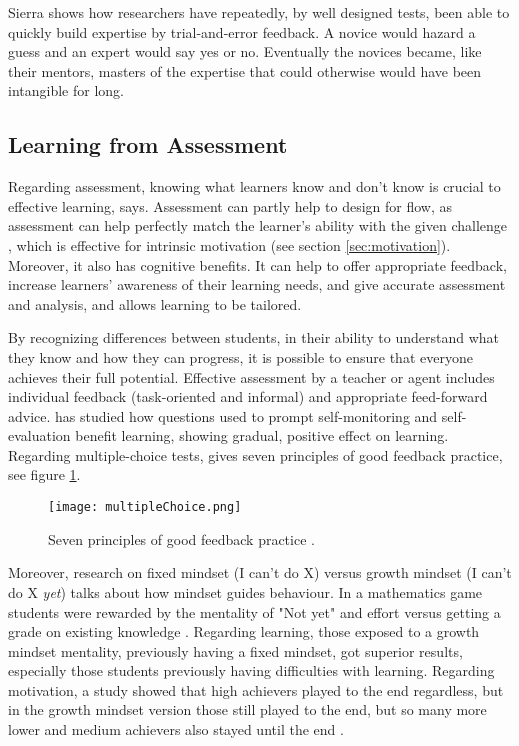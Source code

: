   Sierra shows how researchers have repeatedly, by well designed tests, been able to quickly build expertise by trial-and-error feedback. A novice would hazard a guess and an expert would say yes or no. Eventually the novices became, like their mentors, masters of the expertise that could otherwise would have been intangible for long.

  \subsection{Learning from Assessment}\label{learning-assessment}

  Regarding assessment, knowing what learners know and don't know is crucial to effective learning, \cite{luckin} says. Assessment can partly help to design for flow, as assessment can help perfectly match the learner's ability with the given challenge \citep{bruhlmann}, which is effective for intrinsic motivation (see section \ref{sec:motivation}). Moreover, it also has cognitive benefits. It can help to offer appropriate feedback, increase learners' awareness of their learning needs, and give accurate assessment and analysis, and allows learning to be tailored.

  By recognizing differences between students, in their ability to understand what they know and how they can progress, it is possible to ensure that everyone achieves their full potential. Effective assessment by a teacher or agent includes individual feedback (task-oriented and informal) and appropriate feed-forward advice. \cite{sitzmann} has studied how questions used to prompt self-monitoring and self-evaluation benefit learning, showing gradual, positive  effect on learning. Regarding multiple-choice tests, \cite{nicol} gives seven principles of good feedback practice, see figure \ref{fig:multiple-choice}.

  \begin{figure}[h]
    \centering
    \texttt{[image: multipleChoice.png]}
    \caption{Seven principles of good feedback practice \cite{nicol}.}
    \label{fig:multiple-choice}
\end{figure}

  Moreover, research on fixed mindset (I can't do X) versus growth mindset (I can't do X \textit{yet}) talks about how mindset guides behaviour. In a mathematics game students were rewarded by the mentality of "Not yet" and effort versus getting a grade on existing knowledge \citep{dweck}. Regarding learning, those exposed to a growth mindset mentality, previously having a fixed mindset, got superior results, especially those students previously having difficulties with learning. Regarding motivation, a study showed that high achievers played to the end regardless, but in the growth mindset version those still played to the end, but so many more lower and medium achievers also stayed until the end \citep{dweck}.


